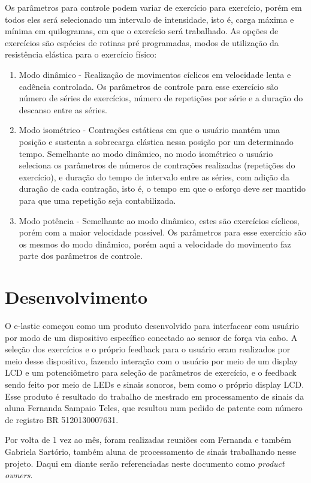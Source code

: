 Os parâmetros para controle podem variar de exercício para exercício, porém em todos eles será selecionado um intervalo de intensidade, isto é, carga máxima e mínima em quilogramas, em que o exercício será trabalhado. As opções de exercícios são espécies de rotinas pré programadas, modos de utilização da resistência elástica para o exercício físico:

\begin{enumerate}
\item Modo dinâmico - Realização de movimentos cíclicos em velocidade lenta e cadência controlada. Os parâmetros de controle para esse exercício são número de séries de exercícios, número de repetições por série e a duração do descanso entre as séries.
\item Modo isométrico - Contrações estáticas em que o usuário mantém uma posição e sustenta a sobrecarga elástica nessa posição por um determinado tempo. Semelhante ao modo dinâmico, no modo isométrico o usuário seleciona os parâmetros de números de contrações realizadas (repetições do exercício), e duração do tempo de intervalo entre as séries, com adição da duração de cada contração, isto é, o tempo em que o esforço deve ser mantido para que uma repetição seja contabilizada.
\item Modo potência - Semelhante ao modo dinâmico, estes são exercícios cíclicos, porém com a maior velocidade possível. Os parâmetros para esse exercício são os mesmos do modo dinâmico, porém aqui a velocidade do movimento faz parte dos parâmetros de controle.
\end{enumerate}

\section{Desenvolvimento}

O e-lastic começou como um produto desenvolvido para interfacear com usuário por modo de um dispositivo específico conectado ao sensor de força via cabo. A seleção dos exercícios e o próprio feedback para o usuário eram realizados por meio desse dispositivo, fazendo interação com o usuário por meio de um display LCD e um potenciômetro para seleção de parâmetros de exercício, e o feedback sendo feito por meio de LEDs e sinais sonoros, bem como o próprio display LCD. Esse produto é resultado do trabalho de mestrado em processamento de sinais da aluna Fernanda Sampaio Teles, que resultou num pedido de patente com número de registro BR 5120130007631.

Por volta de 1 vez ao mês, foram realizadas reuniões com Fernanda e também Gabriela Sartório, também aluna de processamento de sinais trabalhando nesse projeto. Daqui em diante serão referenciadas neste documento como \textit{product owners}.

